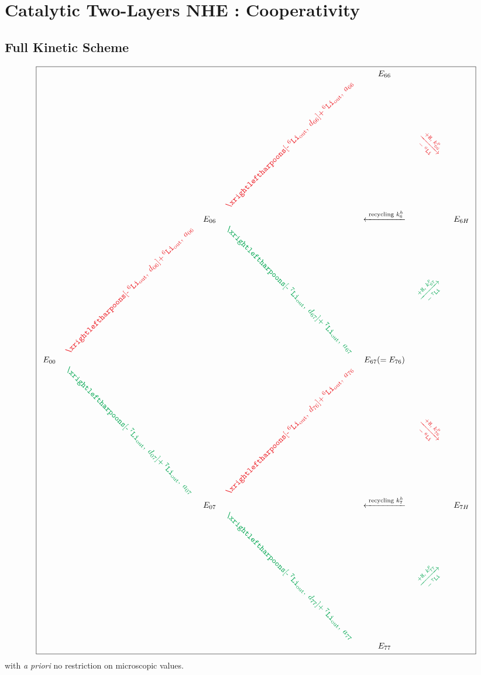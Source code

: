 \documentclass[aps,onecolumn,11pt]{revtex4}
\newcommand{\mychem}[1]{\mathtt{#1}}
\newcommand{\spLi}[1]{{\!~^{#1}\mychem{Li}}}
\newcommand{\spproton}{\mychem{H}}
\newcommand{\myout}[1]{{#1}_{\mathrm{out}}}
\newcommand{\spLiOut}[1]{\myout{\spLi{#1}}}
\newcommand{\myrotate}[2]{\rotatebox[origin=c]{#1}{#2}}
\newcommand{\inpLi}[1]{\text{+}\spLiOut{#1}}
\newcommand{\outLi}[1]{\text{-}\spLiOut{#1}}
\newcommand{\mycolor}[2]{\ifthenelse{\equal{#1}{6}}{{\color{Red}#2}}{{\color{Green}#2}}}
\begin{document}
\section{Catalytic Two-Layers NHE : Cooperativity}
\subsection{Full Kinetic Scheme}
{
\Large
\begin{equation}
\boxed{
\begin{array}{ccccccc}
 & &        &                                                  & E_{66} & & \\
 & &        & \myrotate{45}{\mycolor{6}{$\xrightleftharpoons[\outLi{6},\;d_{66}]{\inpLi{6},\;a_{66}}$}} & &  \myrotate{-45}{\mycolor{6}{$\xrightarrow[-\spLi{6}]{+ \spproton, \; k^p_{66}}$}}& \\
 & & E_{06} &  & \xleftarrow{\text{ recycling } k^h_6 } & & E_{6H}\\
 &  \myrotate{45}{\mycolor{6}{$\xrightleftharpoons[\outLi{6},\;d_{06}]{\inpLi{6},\;a_{06}}$}} &   & \myrotate{-45}{\mycolor{7}{$\xrightleftharpoons[\outLi{7},\;d_{67}]{\inpLi{7},\;a_{67}}$}} & & \myrotate{45}{\mycolor{7}{$\xrightarrow[-\spLi{7}]{+ \spproton, \; k^p_{67}}$}}&\\
E_{00} & &  & & E_{67}(=E_{76}) & & \\ 
  & \myrotate{-45}{\mycolor{7}{$\xrightleftharpoons[\outLi{7},\;d_{07}]{\inpLi{7},\;a_{07}}$}} &  & \myrotate{45}{\mycolor{6}{$\xrightleftharpoons[\outLi{6},\;d_{76}]{\inpLi{6},\;a_{76}}$}} & & \myrotate{-45}{\mycolor{6}{$\xrightarrow[-\spLi{6}]{+ \spproton, \; k^p_{76}}$}} & \\
  & & E_{07} &   & \xleftarrow{\text{ recycling } k^h_7 } & & E_{7H}\\
  & &  & \myrotate{-45}{\mycolor{7}{$\xrightleftharpoons[\outLi{7},\;d_{77}]{\inpLi{7},\;a_{77}}$}} & & \myrotate{45}{\mycolor{7}{$\xrightarrow[-\spLi{7}]{+ \spproton, \; k^p_{77}}$}} &\\
  & &  &  & E_{77} & &\\

 \end{array}
 }
\end{equation}
}
with \textit{a priori} no restriction on microscopic values.
\end{document}
